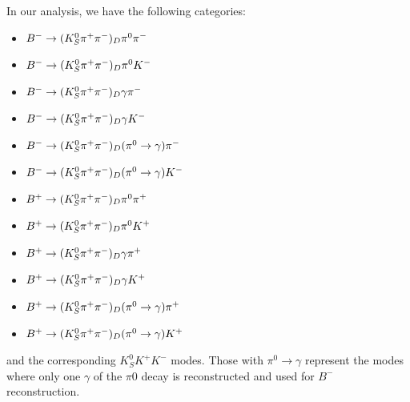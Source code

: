 In our analysis, we have the following categories:
\begin{itemize}
\item ${{{B}^-}} \rightarrow (K_S^0 \pi^+ \pi^-)_D \pi^0 \pi^-$
\item ${{{B}^-}} \rightarrow (K_S^0 \pi^+ \pi^-)_D \pi^0 K^-$
\item ${{{B}^-}} \rightarrow (K_S^0 \pi^+ \pi^-)_D \gamma \pi^-$
\item ${{{B}^-}} \rightarrow (K_S^0 \pi^+ \pi^-)_D \gamma K^-$
\item ${{{B}^-}} \rightarrow (K_S^0 \pi^+ \pi^-)_D (\pi^0 \rightarrow \gamma) \pi^-$
\item ${{{B}^-}} \rightarrow (K_S^0 \pi^+ \pi^-)_D (\pi^0 \rightarrow \gamma) K^-$
\item ${{{B}^+}} \rightarrow (K_S^0 \pi^+ \pi^-)_D \pi^0 \pi^+$
\item ${{{B}^+}} \rightarrow (K_S^0 \pi^+ \pi^-)_D \pi^0 K^+$
\item ${{{B}^+}} \rightarrow (K_S^0 \pi^+ \pi^-)_D \gamma \pi^+$
\item ${{{B}^+}} \rightarrow (K_S^0 \pi^+ \pi^-)_D \gamma K^+$
\item ${{{B}^+}} \rightarrow (K_S^0 \pi^+ \pi^-)_D (\pi^0 \rightarrow \gamma) \pi^+$
\item ${{{B}^+}} \rightarrow (K_S^0 \pi^+ \pi^-)_D (\pi^0 \rightarrow \gamma) K^+$
\end{itemize}
and the corresponding $K_S^0 K^+ K^-$ modes.
Those with $\pi^0 \to \gamma$ represent the  modes where only one $\gamma$ of the $\pi0$ decay is reconstructed and used for $B^-$ reconstruction.

